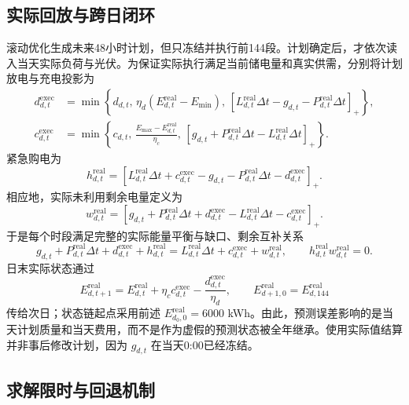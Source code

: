 \documentclass[UTF8,12pt,a4paper]{ctexart}
\begin{document}
\subsection{实际回放与跨日闭环}

滚动优化生成未来48小时计划，但只冻结并执行前144段。计划确定后，才依次读入当天实际负荷与光伏。为保证实际执行满足当前储电量和真实供需，分别将计划放电与充电投影为
\begin{align}
d_{d,t}^{\mathrm{exec}}
&=\min\left\{d_{d,t},\,\eta_d(E_{d,t}^{\mathrm{real}}-E_{\min}),\,
[L_{d,t}^{\mathrm{real}}\Delta t-g_{d,t}-P_{d,t}^{\mathrm{real}}\Delta t]_+\right\},\\
c_{d,t}^{\mathrm{exec}}
&=\min\left\{c_{d,t},\,\frac{E_{\max}-E_{d,t}^{\mathrm{real}}}{\eta_c},\,
[g_{d,t}+P_{d,t}^{\mathrm{real}}\Delta t-L_{d,t}^{\mathrm{real}}\Delta t]_+\right\}.
\label{eq:q2-projection}
\end{align}
紧急购电为
\begin{equation}
h_{d,t}^{\mathrm{real}}=
\left[L_{d,t}^{\mathrm{real}}\Delta t+c_{d,t}^{\mathrm{exec}}
-g_{d,t}-P_{d,t}^{\mathrm{real}}\Delta t-d_{d,t}^{\mathrm{exec}}\right]_+.
\label{eq:q2-real-emergency}
\end{equation}
相应地，实际未利用剩余电量定义为
\begin{equation}
w_{d,t}^{\mathrm{real}}=
\left[g_{d,t}+P_{d,t}^{\mathrm{real}}\Delta t+d_{d,t}^{\mathrm{exec}}
-L_{d,t}^{\mathrm{real}}\Delta t-c_{d,t}^{\mathrm{exec}}\right]_+.
\label{eq:q2-real-surplus}
\end{equation}
于是每个时段满足完整的实际能量平衡与缺口、剩余互补关系
\begin{equation}
g_{d,t}+P_{d,t}^{\mathrm{real}}\Delta t+d_{d,t}^{\mathrm{exec}}+h_{d,t}^{\mathrm{real}}
=L_{d,t}^{\mathrm{real}}\Delta t+c_{d,t}^{\mathrm{exec}}+w_{d,t}^{\mathrm{real}},
\qquad h_{d,t}^{\mathrm{real}}w_{d,t}^{\mathrm{real}}=0.
\label{eq:q2-real-balance}
\end{equation}
日末实际状态通过
\begin{equation}
E_{d,t+1}^{\mathrm{real}}=
E_{d,t}^{\mathrm{real}}+\eta_c c_{d,t}^{\mathrm{exec}}
-\frac{d_{d,t}^{\mathrm{exec}}}{\eta_d},
\qquad
E_{d+1,0}^{\mathrm{real}}=E_{d,144}^{\mathrm{real}}
\label{eq:q2-real-state}
\end{equation}
传给次日；状态链起点采用前述 $E_{d_0,0}^{\mathrm{real}}=6000$ kWh。由此，预测误差影响的是当天计划质量和当天费用，而不是作为虚假的预测状态被全年继承。使用实际值结算并非事后修改计划，因为 $g_{d,t}$ 在当天0:00已经冻结。

\subsection{求解限时与回退机制}
\end{document}
